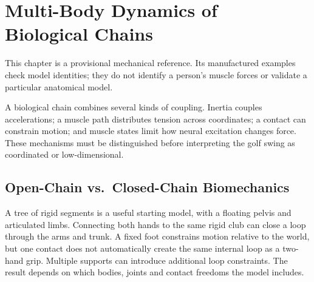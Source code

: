 \chapter[Multi-Body Dynamics of Biological Chains]{Multi-Body Dynamics of\\Biological Chains}
\label{ch:multibody-bio}

\begin{gomdraftnotice}
This chapter is a provisional mechanical reference. Its manufactured examples
check model identities; they do not identify a person's muscle forces or validate
a particular anatomical model.
\end{gomdraftnotice}

A biological chain combines several kinds of coupling. Inertia couples
accelerations; a muscle path distributes tension across coordinates; a contact
can constrain motion; and muscle states limit how neural excitation changes
force. These mechanisms must be distinguished before interpreting the golf
swing as coordinated or low-dimensional.

\section{Open-Chain vs.\ Closed-Chain Biomechanics}

A tree of rigid segments is a useful starting model, with a floating pelvis
and articulated limbs. Connecting both hands to the same rigid club can close a
loop through the arms and trunk. A fixed foot constrains motion relative to the
world, but one contact does not automatically create the same internal loop as
a two-hand grip. Multiple supports can introduce additional loop constraints.
The result depends on which bodies, joints and contact freedoms the model includes.

\begin{center}
\end{center}

